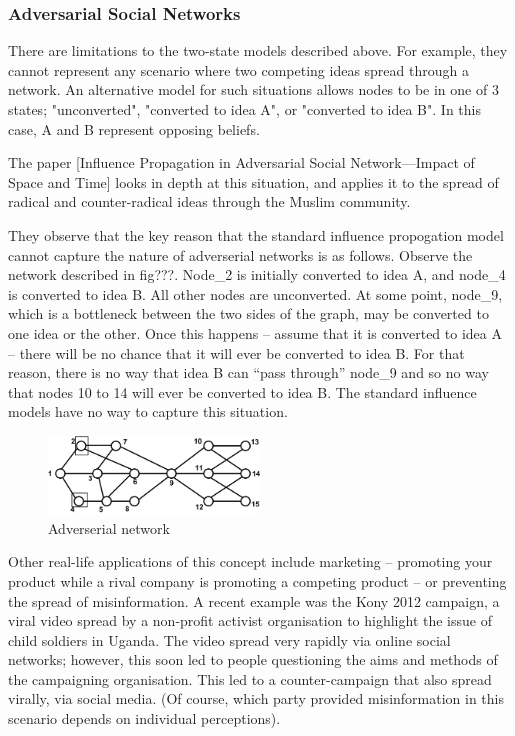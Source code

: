 \subsubsection{Adversarial Social Networks}

 There are limitations to the two-state models described above. For example, they cannot represent any scenario where two competing ideas spread through a network. An alternative model for such situations allows nodes to be in one of 3 states; "unconverted", "converted to idea A", or "converted to idea B". In this case, A and B represent opposing beliefs.

The paper [Influence Propagation in Adversarial Social Network—Impact of Space and Time] looks in depth at this situation, and applies it to the spread of radical and counter-radical ideas through the Muslim community.

They observe that the key reason that the standard influence propogation model cannot capture the nature of adverserial networks is as follows. Observe the network described in fig???. Node\_2 is initially converted to idea A, and node\_4 is converted to idea B. All other nodes are unconverted. At some point, node\_9, which is a bottleneck between the two sides of the graph, may be converted to one idea or the other. Once this happens -- assume that it is converted to idea A -- there will be no chance that it will ever be converted to idea B. For that reason, there is no way that idea B can ``pass through'' node\_9 and so no way that nodes 10 to 14 will ever be converted to idea B. The standard influence models have no way to capture this situation.

\begin{figure}[htbp]
\centering
\includegraphics[width=0.5\textwidth]{./img/adversial_network.png}
\caption{Adverserial network}
\label{fig:adverserial_network}
\end{figure}

Other real-life applications of this concept include marketing -- promoting your product while a rival company is promoting a competing product -- or preventing the spread of misinformation. A recent example was the Kony 2012 campaign, a viral video spread by a non-profit activist organisation to highlight the issue of child soldiers in Uganda. The video spread very rapidly via online social networks; however, this soon led to people questioning the aims and methods of the campaigning organisation. This led to a counter-campaign that also spread virally, via social media. (Of course, which party provided misinformation in this scenario depends on individual perceptions).


